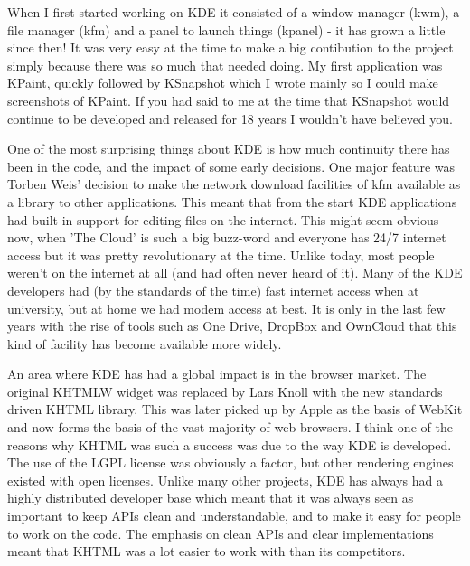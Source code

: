 

\noindent{}When I first started working on KDE it consisted of a window manager (kwm), a file manager (kfm) and a panel to launch things (kpanel) - it has grown a little since then! It was very easy at the time to make a big contibution to the project simply because there was so much that needed doing. My first application was KPaint, quickly followed by KSnapshot which I wrote mainly so I could make screenshots of KPaint. If you had said to me at the time that KSnapshot would continue to be developed and released for 18 years I wouldn't have believed you.

One of the most surprising things about KDE is how much continuity there has been in the code, and the impact of some early decisions. One major feature was Torben Weis' decision to make the network download facilities of kfm available as a library to other applications. This meant that from the start KDE applications had built-in support for editing files on the internet. This might seem obvious now, when 'The Cloud' is such a big buzz-word and everyone has 24/7 internet access but it was pretty revolutionary at the time. Unlike today, most people weren't on the internet at all (and had often never heard of it). Many of the KDE developers had (by the standards of the time) fast internet access when at university, but at home we had modem access at best. It is only in the last few years with the rise of tools such as One Drive, DropBox and OwnCloud that this kind of facility has become available more widely.

An area where KDE has had a global impact is in the browser market. The original KHTMLW widget was replaced by Lars Knoll with the new standards driven KHTML library. This was later picked up by Apple as the basis of WebKit and now forms the basis of the vast majority of web browsers. I think one of the reasons why KHTML was such a success was due to the way KDE is developed. The use of the LGPL license was obviously a factor, but other rendering engines existed with open licenses. Unlike many other projects, KDE has always had a highly distributed developer base which meant that it was always seen as important to keep APIs clean and understandable, and to make it easy for people to work on the code. The emphasis on clean APIs and clear implementations meant that KHTML was a lot easier to work with than its competitors.

